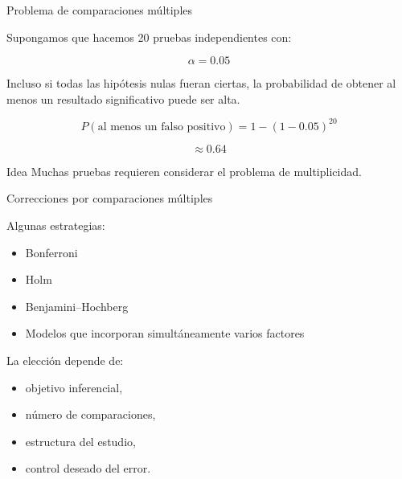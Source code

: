 \documentclass[aspectratio=169,11pt]{beamer}
\begin{document}
\begin{frame}{Problema de comparaciones múltiples}

Supongamos que hacemos 20 pruebas independientes con:

\[
\alpha=0.05
\]

Incluso si todas las hipótesis nulas fueran ciertas,
la probabilidad de obtener al menos un resultado significativo puede ser
alta.

\[
P(\text{al menos un falso positivo})
=
1-(1-0.05)^{20}
\]

\[
\approx 0.64
\]

\begin{alertblock}{Idea}
Muchas pruebas requieren considerar el problema de multiplicidad.
\end{alertblock}

\end{frame}

\begin{frame}{Correcciones por comparaciones múltiples}

Algunas estrategias:

\begin{itemize}
    \item Bonferroni
    \item Holm
    \item Benjamini--Hochberg
    \item Modelos que incorporan simultáneamente varios factores
\end{itemize}

La elección depende de:

\begin{itemize}
    \item objetivo inferencial,
    \item número de comparaciones,
    \item estructura del estudio,
    \item control deseado del error.
\end{itemize}

\end{frame}
\end{document}
